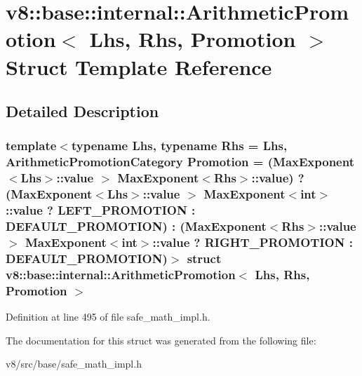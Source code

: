 \hypertarget{structv8_1_1base_1_1internal_1_1ArithmeticPromotion}{}\section{v8\+:\+:base\+:\+:internal\+:\+:Arithmetic\+Promotion$<$ Lhs, Rhs, Promotion $>$ Struct Template Reference}
\label{structv8_1_1base_1_1internal_1_1ArithmeticPromotion}


\subsection{Detailed Description}
\subsubsection*{template$<$typename Lhs, typename Rhs = Lhs, Arithmetic\+Promotion\+Category Promotion = (\+Max\+Exponent$<$\+Lhs$>$\+::value $>$ Max\+Exponent$<$\+Rhs$>$\+::value) ? (\+Max\+Exponent$<$\+Lhs$>$\+::value $>$ Max\+Exponent$<$int$>$\+::value                         ? L\+E\+F\+T\+\_\+\+P\+R\+O\+M\+O\+T\+I\+O\+N                         \+: D\+E\+F\+A\+U\+L\+T\+\_\+\+P\+R\+O\+M\+O\+T\+I\+O\+N) \+: (\+Max\+Exponent$<$\+Rhs$>$\+::value $>$ Max\+Exponent$<$int$>$\+::value                         ? R\+I\+G\+H\+T\+\_\+\+P\+R\+O\+M\+O\+T\+I\+O\+N                         \+: D\+E\+F\+A\+U\+L\+T\+\_\+\+P\+R\+O\+M\+O\+T\+I\+O\+N)$>$\newline
struct v8\+::base\+::internal\+::\+Arithmetic\+Promotion$<$ Lhs, Rhs, Promotion $>$}



Definition at line 495 of file safe\+\_\+math\+\_\+impl.\+h.



The documentation for this struct was generated from the following file\+:\begin{DoxyCompactItemize}
\item 
v8/src/base/safe\+\_\+math\+\_\+impl.\+h\end{DoxyCompactItemize}
